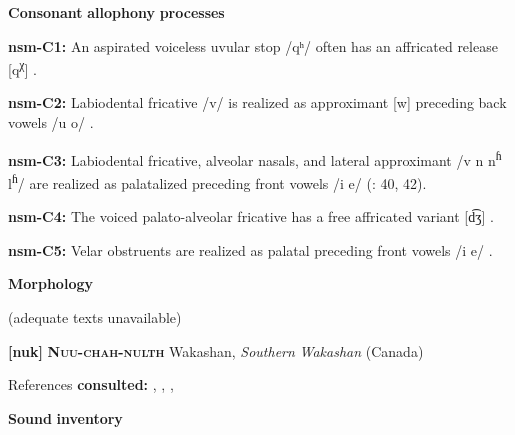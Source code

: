 \documentclass[output=paper]{langsci/langscibook}
\begin{document}
\begin{styleBody}
\textbf{Consonant} \textbf{allophony} \textbf{processes}
\end{styleBody}

\begin{styleBody}
\textbf{nsm-C1:} An aspirated voiceless uvular stop /qʰ/ often has an affricated release [q\textsuperscript{χ}] \citep[39]{Teo2009}.
\end{styleBody}

\begin{styleBody}
\textbf{nsm-C2:} Labiodental fricative /v/ is realized as approximant [w] preceding back vowels /u o/ \citep[39]{Teo2009}.
\end{styleBody}

\begin{styleBody}
\textbf{nsm-C3:} Labiodental fricative, alveolar nasals, and lateral approximant /v n n\textsuperscript{ɦ} l\textsuperscript{ɦ}/ are realized as palatalized preceding front vowels /i e/ (\citealt{Teo2009}: 40, 42).
\end{styleBody}

\begin{styleBody}
\textbf{nsm-C4:} The voiced palato-alveolar fricative has a free affricated variant [d͡ʒ] \citep[40]{Teo2009}.
\end{styleBody}

\begin{styleBody}
\textbf{nsm-C5:} Velar obstruents are realized as palatal preceding front vowels /i e/ \citep[368]{Teo2012}.
\end{styleBody}

\begin{styleBody}
\textbf{Morphology}
\end{styleBody}

\begin{styleBody}
(adequate texts unavailable)
\end{styleBody}

\begin{styleBody}
\textbf{[nuk]}   \textbf{\textsc{Nuu-chah-nulth}}  Wakashan, \textit{Southern} \textit{Wakashan} (Canada)
\end{styleBody}

\begin{styleBody}
References \textbf{consulted:} \citet{CarlsonEtAl2001}, \citet{Kim2003}, \citet{Rose1981}, \citet{Stonham1999}
\end{styleBody}

\begin{styleBody}
\textbf{Sound} \textbf{inventory}
\end{styleBody}
\end{document}
